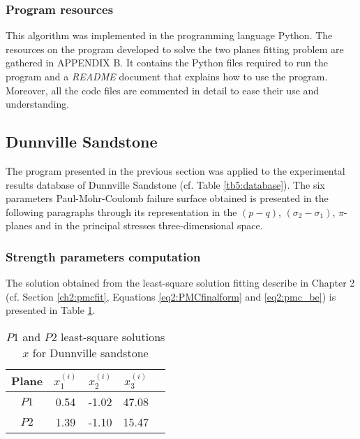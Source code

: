 \subsubsection{Program resources}

This algorithm was implemented in the programming language Python. The resources on the program developed to solve the two planes fitting problem are gathered in APPENDIX B. It contains the Python files required to run the program and a \emph{README} document that explains how to use the program. Moreover, all the code files are commented in detail to ease their use and understanding.  

\subsection{Dunnville Sandstone}

The program presented in the previous section was applied to the experimental results database of Dunnville Sandstone (cf. Table \ref{tb5:database}). The six parameters Paul-Mohr-Coulomb failure surface obtained is presented in the following paragraphs through its representation in the $(p-q)$, $(\sigma_2-\sigma_1)$, $\pi$- planes and in the principal stresses three-dimensional space. 

\subsubsection{Strength parameters computation}

The solution obtained from the least-square solution fitting describe in Chapter 2 (cf. Section \ref{ch2:pmcfit}, Equations \ref{eq2:PMCfinalform} and \ref{eq2:pmc_be}) is presented in Table \ref{tb5:dunn_sol1}. 

\begin{table} [p]
    \centering 
    \begin{tabular}{ccccc}
        \hline 
        Plane & $x_1^{(i)}$ & $x_2^{(i)}$ & $x_3^{(i)}$ \\
        \hline
        \hline
        $P1$ & 0.54 & -1.02 & 47.08 \\
        $P2$ & 1.39 & -1.10 & 15.47 \\
        \hline
    \end{tabular}
    \captionsetup{justification=centering}
    \caption{$P1$ and $P2$ least-square solutions $x$ for Dunnville sandstone}
    \label{tb5:dunn_sol1}
\end{table}

